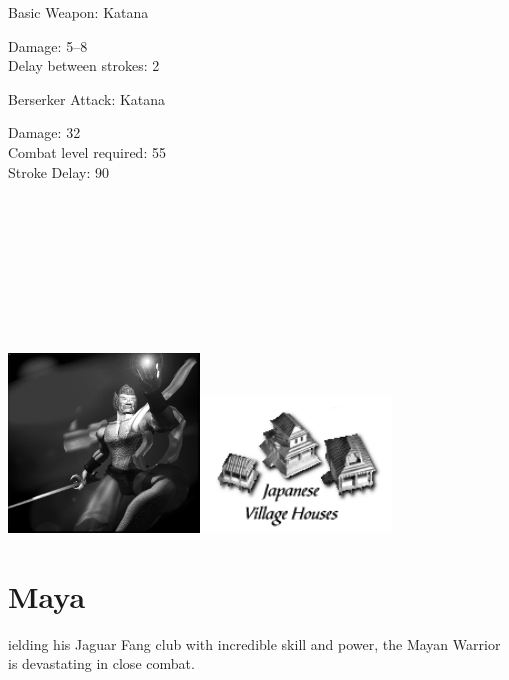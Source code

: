 Basic Weapon: Katana
\begin{changemargin}{.5cm}{0cm}
	Damage: 5–8 \\
	Delay between strokes: 2
\end{changemargin}
Berserker Attack: Katana
\begin{changemargin}{.5cm}{0cm}
	Damage: 32 \\
	Combat level required: 55 \\
	Stroke Delay: 90 \\ \\ \\ \\ \\ \\ \\ \\ \\
\end{changemargin}

\begin{center}
	\includegraphics[width=2in]{Amindturner}\hspace{1pt}\includegraphics[width=2in]{Ijapanesehouse}
\end{center}

\clearpage

\section{Maya}


ielding his Jaguar Fang club with incredible skill and power, the Mayan Warrior is devastating in close combat.

